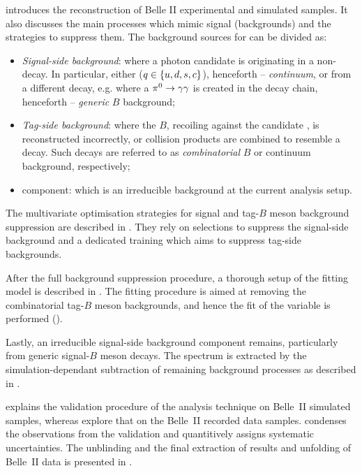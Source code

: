  introduces the reconstruction of Belle II experimental and simulated \BtoXsgamma samples.
It also discusses the main processes which mimic \BtoXsgamma signal (backgrounds) and the strategies to suppress them.
The background sources for \BtoXsgamma can be divided as:
\begin{itemize}
    \item \textit{Signal-side background}: where a photon candidate is originating in a non-\BtoXsgamma decay.
    In particular, either \epem\ra\qqbar ($q\in\{u,d,s,c\}$), henceforth -- \textit{continuum}, or from a different \B decay, e.g. where a $\pi^0\rightarrow\gamma\gamma$ is created in the decay chain, henceforth -- \textit{generic} $B$ background;
    \item \textit{Tag-side background}: where the $B$, recoiling against the candidate \BtoXsgamma, is reconstructed incorrectly, or \epem\ra\qqbar collision products are combined to resemble a \B decay.
    Such decays are referred to as \textit{combinatorial} $B$ or continuum background, respectively;
    \item \BtoXdgamma component: which is an irreducible background at the current analysis setup. 
\end{itemize}

The
multivariate optimisation strategies for signal and tag-$B$ meson background suppression are described in 
.
They rely on selections to suppress the signal-side background and a dedicated \BDT training which aims to suppress tag-side backgrounds.

After the full background suppression procedure, a thorough setup of the fitting model is described in .
The fitting procedure is aimed at removing the combinatorial tag-$B$ meson backgrounds, and hence the fit of the \Mbc variable is performed ().

Lastly, an irreducible signal-side background component remains, particularly from generic signal-$B$ meson decays.
The \EB spectrum is extracted by the simulation-dependant subtraction of remaining background processes as described in .

 explains the validation procedure of the analysis technique on Belle~II simulated samples,
whereas  explore that on the Belle~II recorded data samples.
 condenses the observations from the validation and quantitively assigns systematic uncertainties.
The unblinding and the final extraction of results and unfolding of Belle~II data is presented in .
